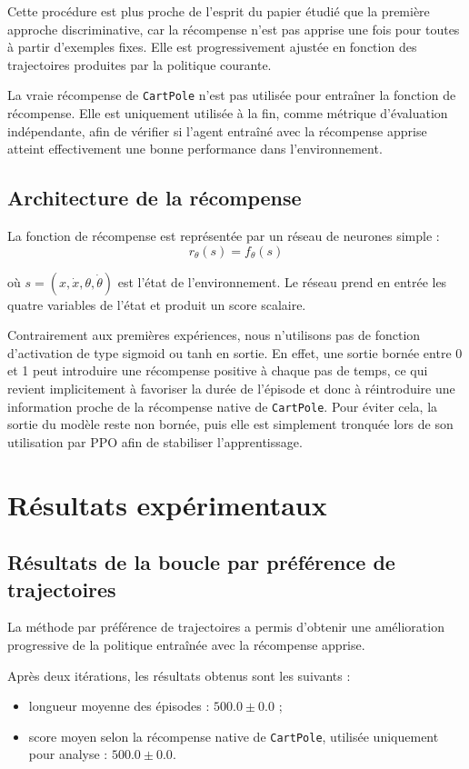 Cette procédure est plus proche de l’esprit du papier étudié que la première approche discriminative, car la récompense n’est pas apprise une fois pour toutes à partir d’exemples fixes. Elle est progressivement ajustée en fonction des trajectoires produites par la politique courante.

La vraie récompense de \texttt{CartPole} n’est pas utilisée pour entraîner la fonction de récompense. Elle est uniquement utilisée à la fin, comme métrique d’évaluation indépendante, afin de vérifier si l’agent entraîné avec la récompense apprise atteint effectivement une bonne performance dans l’environnement.

\subsection{Architecture de la récompense}

La fonction de récompense est représentée par un réseau de neurones simple :
\[
r_\theta(s) = f_\theta(s)
\]

où \(s = (x,\dot{x},\theta,\dot{\theta})\) est l’état de l’environnement. Le réseau prend en entrée les quatre variables de l’état et produit un score scalaire.

Contrairement aux premières expériences, nous n’utilisons pas de fonction d’activation de type sigmoid ou tanh en sortie. En effet, une sortie bornée entre 0 et 1 peut introduire une récompense positive à chaque pas de temps, ce qui revient implicitement à favoriser la durée de l’épisode et donc à réintroduire une information proche de la récompense native de \texttt{CartPole}. Pour éviter cela, la sortie du modèle reste non bornée, puis elle est simplement tronquée lors de son utilisation par PPO afin de stabiliser l’apprentissage.

\section{Résultats expérimentaux}

\subsection{Résultats de la boucle par préférence de trajectoires}

La méthode par préférence de trajectoires a permis d’obtenir une amélioration progressive de la politique entraînée avec la récompense apprise.

Après deux itérations, les résultats obtenus sont les suivants :
\begin{itemize}
    \item longueur moyenne des épisodes : \(500.0 \pm 0.0\) ;
    \item score moyen selon la récompense native de \texttt{CartPole}, utilisée uniquement pour analyse : \(500.0 \pm 0.0\).
\end{itemize}

